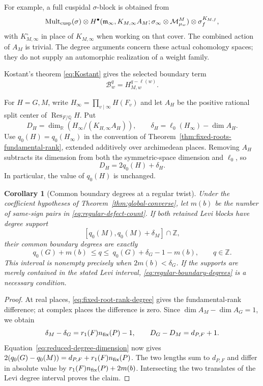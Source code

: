\documentclass[12pt]{amsart}
\numberwithin{equation}{section}
\theoremstyle{plain}
\newtheorem{corollary}[theorem]{Corollary}
\theoremstyle{definition}
\theoremstyle{remark}
\newcommand{\Q}{\mathbb Q}
\newcommand{\R}{\mathbb R}
\newcommand{\Z}{\mathbb{Z}}
\newcommand{\cM}{\mathcal M}
\begin{document}
For example, a full cuspidal $\sigma$-block is obtained from
\[
 \operatorname{Mult}_{\rm cusp}(\sigma)\otimes
 H^\bullet(\mathfrak m_\infty,K_{M,\infty}A_M;
       \sigma_\infty\otimes\cM_{\mu_w}^M)
 \otimes\sigma_f^{K_{M,f}},
\]
with $K_{M,\infty}^{\circ}$ in place of $K_{M,\infty}$ when working on that cover. The combined action of $A_M$ is trivial. The degree arguments concern these actual cohomology spaces; they do not supply an automorphic realization of a weight family.

Kostant's theorem \eqref{eq:Kostant} gives the selected boundary term 
\[
 \mathcal B_w^q=H_{M,w}^{q-\ell(w)}.
\]

For $H=G,M$, write $H_\infty=\prod_{v\mid\infty}H(F_v)$ and let $A_H$ be the positive rational split center of $\operatorname{Res}_{F/\Q}H$. Put  
\begin{equation}\label{eq:reduced-degree-invariants}
 D_H=\dim_{\R}(H_\infty/(K_{H,\infty}A_H)),\qquad
 \delta_H=\ell_0(H_\infty)-\dim A_H.
\end{equation}
Use $q_0(H)=q_0(H_\infty)$ in the convention of Theorem~\ref{thm:fixed-roots-fundamental-rank}, extended additively over archimedean places. Removing $A_H$ subtracts its dimension from both the symmetric-space dimension and $\ell_0$, so 
\begin{equation}\label{eq:reduced-degree-dimension}
 D_H=2q_0(H)+\delta_H.
\end{equation}
In particular, the value of $q_0(H)$ is unchanged.

\begin{corollary}[Common boundary degrees at a regular twist] \label{cor:regular-boundary-window}
Under the coefficient hypotheses of Theorem~\ref{thm:global-converse}, let $m(b)$ be the number of same-sign pairs in \eqref{eq:regular-defect-count}. If both retained Levi blocks have degree support 
\[
 [q_0(M),q_0(M)+\delta_M]\cap\Z,
\]
their common boundary degrees are exactly 
\begin{equation}\label{eq:regular-boundary-degrees}
 q_0(G)+m(b)\ \le q\le\ q_0(G)+\delta_G-1-m(b),
 \qquad q\in\Z.
\end{equation}
This interval is nonempty precisely when $2m(b)<\delta_G$. If the supports are merely contained in the stated Levi interval, \eqref{eq:regular-boundary-degrees} is a necessary condition. 
\end{corollary}

\begin{proof}
At real places, \eqref{eq:fixed-root-rank-degree} gives the fundamental-rank difference; at complex places the difference is zero. Since $\dim A_M-\dim A_G=1$, we obtain 
\[
 \delta_M-\delta_G=r_1(F)n_{\rm fix}(P)-1,
 \qquad D_G-D_M=d_{P,F}+1.
\]
Equation~\eqref{eq:reduced-degree-dimension} now gives $2(q_0(G)-q_0(M))=d_{P,F}+r_1(F)n_{\rm fix}(P)$. The two lengths sum to $d_{P,F}$ and differ in absolute value by $r_1(F)n_{\rm fix}(P)+2m(b)$. Intersecting the two translates of the Levi degree interval proves the claim. 
\end{proof}
\end{document}

